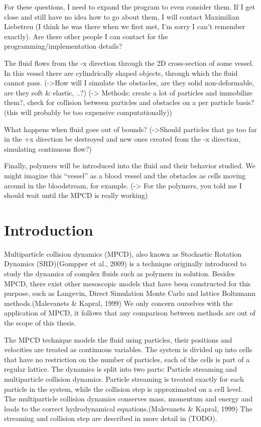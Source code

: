 \documentclass[
]{article}
\begin{document}
For these questions, I need to expand the program to even consider them.
If I get close and still have no idea how to go about them, I will
contact Maximilian Liebetreu (I think he was there when we first met,
I'm sorry I can't remember exactly). Are there other people I can
contact for the programming/implementation details?

The fluid flows from the -x direction through the 2D cross-section of
some vessel. In this vessel there are cylindrically shaped objects,
through which the fluid cannot pass. (-\textgreater How will I simulate
the obstacles, are they solid non-deformable, are they soft \& elastic,
..?) (-\textgreater{} Methods: create a lot of particles and immobilize
them?, check for collision between particles and obstacles on a per
particle basis? (this will probably be too expensive computationally))

What happens when fluid goes out of bounds? (-\textgreater Should
particles that go too far in the +x direction be destroyed and new ones
created from the -x direction, simulating continuous flow?)

Finally, polymers will be introduced into the fluid and their behavior
studied. We might imagine this ``vessel'' as a blood vessel and the
obstacles as cells moving around in the bloodstream, for example.
(-\textgreater{} For the polymers, you told me I should wait until the
MPCD is really working)

\hypertarget{introduction}{%
\section{Introduction}\label{introduction}}

Multiparticle collision dynamics (MPCD), also known as Stochastic
Rotation Dynamics (SRD)(Gompper et al., 2009) is a technique originally
introduced to study the dynamics of complex fluids such as polymers in
solution. Besides MPCD, there exist other mesoscopic models that have
been constructed for this purpose, such as Langevin, Direct Simulation
Monte Carlo and lattice Boltzmann methods.(Malevanets \& Kapral, 1999)
We only concern ourselves with the application of MPCD, it follows that
any comparison between methods are out of the scope of this thesis.

The MPCD technique models the fluid using particles, their positions and
velocities are treated as continuous variables. The system is divided up
into cells that have no restriction on the number of particles, each of
the cells is part of a regular lattice. The dynamics is split into two
parts: Particle streaming and multiparticle collision dynamics. Particle
streaming is treated exactly for each particle in the system, while the
collision step is approximated on a cell level. The multiparticle
collision dynamics conserves mass, momentum and energy and leads to the
correct hydrodynamical equations.(Malevanets \& Kapral, 1999) The
streaming and collision step are described in more detail in (TODO).
\end{document}
